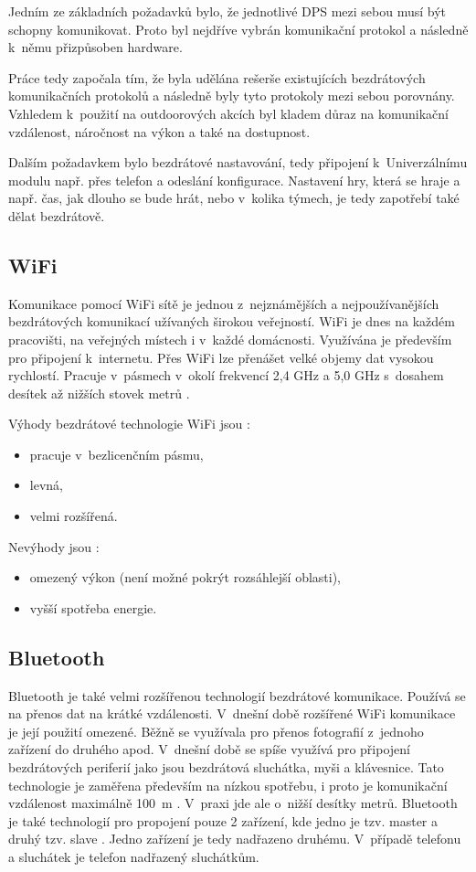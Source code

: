 Jedním ze základních požadavků bylo, že jednotlivé DPS mezi sebou musí být schopny komunikovat. Proto byl nejdříve vybrán komunikační 
protokol a následně k~němu přizpůsoben hardware. 

Práce tedy započala tím, že byla udělána rešerše existujících bezdrátových komunikačních protokolů a následně byly tyto protokoly 
mezi sebou porovnány. Vzhledem k~použití na outdoorových akcích byl kladem důraz na komunikační vzdálenost, náročnost na výkon 
a také na dostupnost. 

Dalším požadavkem bylo bezdrátové nastavování, tedy připojení k~Univerzálnímu modulu např. přes telefon a odeslání konfigurace. Nastavení hry,
která se hraje a např. čas, jak dlouho se bude hrát, nebo v~kolika týmech, je tedy zapotřebí také dělat bezdrátově. 

\subsection{WiFi}
Komunikace pomocí WiFi sítě je jednou z~nejznámějších a nejpoužívanějších bezdrátových komunikací užívaných širokou veřejností. 
WiFi je dnes na každém pracovišti, na veřejných místech i v~každé domácnosti. Využívána je především pro připojení k~internetu. 
Přes WiFi lze přenášet velké objemy dat vysokou rychlostí. Pracuje v~pásmech v~okolí frekvencí 2,4 GHz a 5,0 GHz s~dosahem 
desítek až nižších stovek metrů \cite{Bezdrat_muni}. 

Výhody bezdrátové technologie WiFi jsou \cite{Bezdrat_muni}:
\begin{itemize}
  \item pracuje v~bezlicenčním pásmu, 
  \item levná, 
  \item velmi rozšířená.
\end{itemize}

Nevýhody jsou \cite{Bezdrat_muni}:
\begin{itemize}
  \item omezený výkon (není možné pokrýt rozsáhlejší oblasti), 
  \item vyšší spotřeba energie.
\end{itemize}

\subsection{Bluetooth}
Bluetooth je také velmi rozšířenou technologií bezdrátové komunikace. Používá se na přenos dat na krátké vzdálenosti. V~dnešní době 
rozšířené WiFi komunikace je její použití omezené. Běžně se využívala pro přenos fotografií z~jednoho zařízení do druhého apod. V~dnešní 
době se spíše využívá pro připojení bezdrátových periferií jako jsou bezdrátová sluchátka, myši a klávesnice. Tato technologie je zaměřena 
především na nízkou spotřebu, i proto je komunikační vzdálenost maximálně 100~m \cite{Bezdrat_muni}. V~praxi jde ale o~nižší desítky
metrů. Bluetooth je také technologií pro propojení pouze 2 zařízení, kde jedno je tzv. master a druhý tzv. slave \cite{Bezdrat_muni}. 
Jedno zařízení je tedy nadřazeno druhému. V~případě telefonu a sluchátek je telefon nadřazený sluchátkům. 

